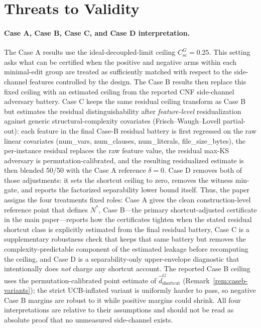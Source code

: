 \documentclass[conference]{IEEEtran}
\theoremstyle{remark}
\newcommand{\hatshortcutDisc}{\hat d_{\mathrm{shortcut}}^{G}}
\newcommand{\shortcutCeiling}{C_{\mathrm{sc}}^{G}}
\begin{document}
\section{Threats to Validity}
\label{sec:threats}


\paragraph{Case A, Case B, Case C, and Case D interpretation.}
The Case A results use the ideal-decoupled-limit ceiling $\shortcutCeiling=0.25$.
This setting asks what can be certified when the positive and negative arms within each minimal-edit group are treated as sufficiently matched with respect to the side-channel features controlled by the design.
The Case B results then replace this fixed ceiling with an estimated ceiling from the reported CNF side-channel adversary battery.
Case C keeps the same residual ceiling transform as Case B but estimates the residual distinguishability after \emph{feature-level} residualization against generic structural-complexity covariates (Frisch--Waugh--Lovell partial-out): each feature in the final Case-B residual battery is first regressed on the raw linear covariates (num\_vars, num\_clauses, num\_literals, file\_size\_bytes), the per-instance residual replaces the raw feature value, the residual max-KS adversary is permutation-calibrated, and the resulting residualized estimate is then blended 50/50 with the Case A reference $\delta=0$.
Case D removes both of those adjustments: it sets the shortcut ceiling to zero, removes the witness min-gate, and reports the factorized separability lower bound itself.  Thus, the paper assigns the four treatments fixed roles: Case A gives the clean construction-level reference point that defines $N^*$, Case B---the primary shortcut-adjusted certificate in the main paper---reports how the certificates tighten when the stated residual shortcut class is explicitly estimated from the final residual battery, Case C is a supplementary robustness check that keeps that same battery but removes the complexity-predictable component of the estimated leakage before recomputing the ceiling, and Case D is a separability-only upper-envelope diagnostic that intentionally does \emph{not} charge any shortcut account.  The reported Case B ceiling uses the permutation-calibrated point estimate of $\hatshortcutDisc$ (Remark~\ref{rem:caseb-variants}); the strict UCB-inflated variant is uniformly harder to pass, so negative Case B margins are robust to it while positive margins could shrink.
All four interpretations are relative to their assumptions and should not be read as absolute proof that no unmeasured side-channel exists.
\end{document}
